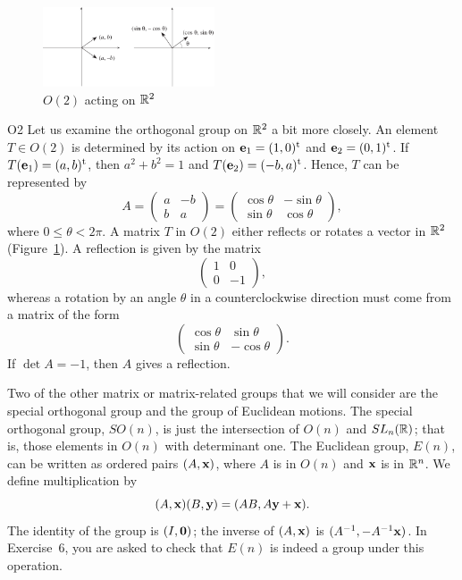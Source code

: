 
 
\begin{figure}[htb]
\begin{center}
\centerline {
\includegraphics[width=2in]{O2}
}
\end{center}
\caption{$O(2)$ acting on ${\Bbb R}^2$}
\label{O2}
\end{figure}
 
\begin{example}{O2}
Let us examine the orthogonal group  on ${\Bbb R}^2$ a bit more
closely.  An element $T \in O(2)$ is determined by its action on
${\bold e}_1 = (1, 0)^{\rm t}$ and ${\bold e}_2 = (0, 1)^{\rm t}$. If
$T({\bold e}_1) = (a,b)^{\rm t}$, then $a^2 + b^2 = 1$ and $T({\bold
e}_2) = (-b, a)^{\rm t}$. Hence, $T$ can be represented by 
\[
A
=
\left(
\begin{array}{cc}
a & -b \\
b & a
\end{array}
\right)
=
\left(
\begin{array}{cc}
\cos \theta & - \sin \theta \\
\sin \theta & \cos \theta
\end{array}
\right),
\]
where $0 \leq \theta < 2 \pi$. A matrix $T$ in $O(2)$ either reflects
or rotates a vector in ${\Bbb R}^2$ (Figure~\ref{O2}). A reflection is
given by the matrix 
\[
\left(
\begin{array}{cc}
1 & 0 \\
0 & -1
\end{array}
\right),
\]
whereas a rotation by an angle $\theta$ in a counterclockwise direction
must come from a matrix of the form 
\[
\left(
\begin{array}{cc}
\cos \theta & \sin \theta \\
\sin \theta & -\cos \theta
\end{array}
\right).
\]
If $\det A =-1$, then $A$ gives a reflection.
\end{example}
 
 
 
Two of the other matrix or matrix-related groups that we will consider
are the special orthogonal group  and the group of Euclidean motions.
The {\bfi special orthogonal group},
$SO(n)$\label{notespecialorthog}, is just the intersection of $O(n)$
and $SL_n({\Bbb R})$; that is, those elements in $O(n)$ with determinant
one. The {\bfi Euclidean
group},
$E(n)$\label{noteeuclidgroup}, can be written as ordered pairs $(A,
{\bold x})$, where $A$ is in $O(n)$ and ${\bold x}$ is in ${\Bbb
R}^n$. We define multiplication by
\[
(A, {\bold x}) (B, {\bold y})
=
(AB, A {\bold y} +{\bold x}).
\]
The identity of the group is $(I,{\bold 0})$; the inverse of $(A,
{\bold x})$ is $(A^{-1}, -A^{-1} {\bold x})$. In Exercise~6, you 
are asked to check that $E(n)$ is indeed a group under this operation.
 
